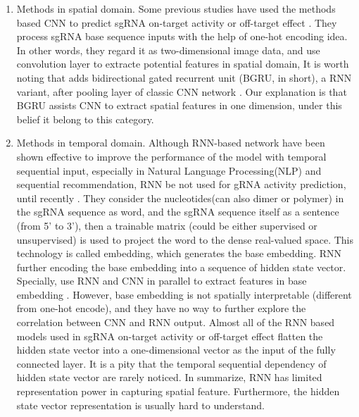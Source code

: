 \documentclass{bioinfo}
\begin{document}
\begin{enumerate}
    \item Methods in spatial domain. 
    Some previous studies have used the methods based CNN to predict sgRNA on-target activity or off-target effect \citep{chuai2018deepcrispr,kim2018deep,lin2018off-target}. 
    They process sgRNA base sequence inputs with the help of one-hot encoding idea. 
    In other words, they regard it as two-dimensional image data, and use convolution layer to extracte potential features in spatial domain, 
    It is worth noting that \citeauthor{zhang2020c-rnncrispr:} adds bidirectional gated recurrent unit (BGRU, in short), a RNN variant, after pooling layer of classic CNN network \citep{zhang2020c-rnncrispr:}. 
    Our explanation is that BGRU assists CNN to extract spatial features in one dimension, under this belief it belong to this category. 
    \item Methods in temporal domain. 
    Although RNN-based network have been shown effective to improve the performance of the model with temporal sequential input, especially in Natural Language Processing(NLP) and sequential recommendation, 
    RNN be not used for gRNA activity prediction, until recently \citep{Liu2019,wang2019optimized,liu2020deep}. 
    They consider the nucleotides(can also dimer or polymer) in the sgRNA sequence as word, and the sgRNA sequence itself as a sentence (from 5' to 3'), then a trainable matrix (could be either supervised or unsupervised) is used to project the word to the dense real-valued space. 
    This technology is called embedding, which generates the base embedding. RNN further encoding the base embedding into a sequence of hidden state vector. 
    Specially, \citeauthor{Liu2019} use RNN and CNN in parallel to extract features in base embedding \citep{Liu2019}. 
    However, base embedding is not spatially interpretable (different from one-hot encode), and they have no way to further explore the correlation between CNN and RNN output. 
    Almost all of the RNN based models used in sgRNA on-target activity or off-target effect flatten the hidden state vector into a one-dimensional vector as the input of the fully connected layer. 
    It is a pity that the temporal sequential dependency of hidden state vector are rarely noticed. 
    In summarize, RNN has limited representation power in capturing spatial feature. 
    Furthermore, the hidden state vector representation is usually hard to understand.
\end{enumerate}
\end{document}
